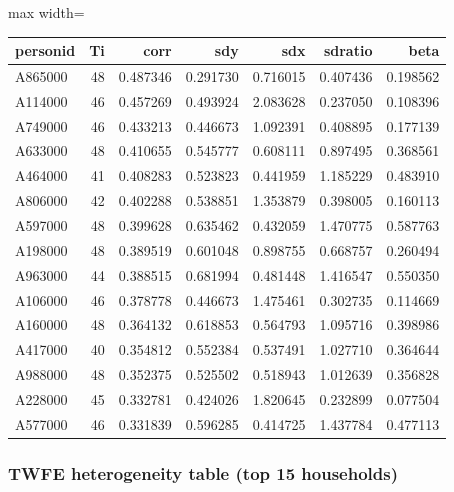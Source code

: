 \documentclass[a4paper,11pt]{article}
\renewcommand{\_}{\textunderscore\allowbreak}
\renewcommand{\arraystretch}{1.25}
\begin{document}
\begin{center}
\begingroup
\footnotesize
\setlength{\tabcolsep}{4pt}
\renewcommand{\arraystretch}{1.22}
\begin{adjustbox}{max width=\textwidth}
\begin{tabular}{@{}lrrrrrr@{}}
\toprule
personid & T\_i & corr & sd\_y & sd\_x & sd\_ratio & beta \\
\midrule
A865000 & 48 & 0.487346 & 0.291730 & 0.716015 & 0.407436 & 0.198562 \\
A114000 & 46 & 0.457269 & 0.493924 & 2.083628 & 0.237050 & 0.108396 \\
A749000 & 46 & 0.433213 & 0.446673 & 1.092391 & 0.408895 & 0.177139 \\
A633000 & 48 & 0.410655 & 0.545777 & 0.608111 & 0.897495 & 0.368561 \\
A464000 & 41 & 0.408283 & 0.523823 & 0.441959 & 1.185229 & 0.483910 \\
A806000 & 42 & 0.402288 & 0.538851 & 1.353879 & 0.398005 & 0.160113 \\
A597000 & 48 & 0.399628 & 0.635462 & 0.432059 & 1.470775 & 0.587763 \\
A198000 & 48 & 0.389519 & 0.601048 & 0.898755 & 0.668757 & 0.260494 \\
A963000 & 44 & 0.388515 & 0.681994 & 0.481448 & 1.416547 & 0.550350 \\
A106000 & 46 & 0.378778 & 0.446673 & 1.475461 & 0.302735 & 0.114669 \\
A160000 & 48 & 0.364132 & 0.618853 & 0.564793 & 1.095716 & 0.398986 \\
A417000 & 40 & 0.354812 & 0.552384 & 0.537491 & 1.027710 & 0.364644 \\
A988000 & 48 & 0.352375 & 0.525502 & 0.518943 & 1.012639 & 0.356828 \\
A228000 & 45 & 0.332781 & 0.424026 & 1.820645 & 0.232899 & 0.077504 \\
A577000 & 46 & 0.331839 & 0.596285 & 0.414725 & 1.437784 & 0.477113 \\
\bottomrule
\end{tabular}
\end{adjustbox}
\endgroup
\end{center}


\hypertarget{twfe-heterogeneity-table-top-15-households}{%
\subsubsection{TWFE heterogeneity table (top 15
households)}\label{twfe-heterogeneity-table-top-15-households}}
\end{document}
